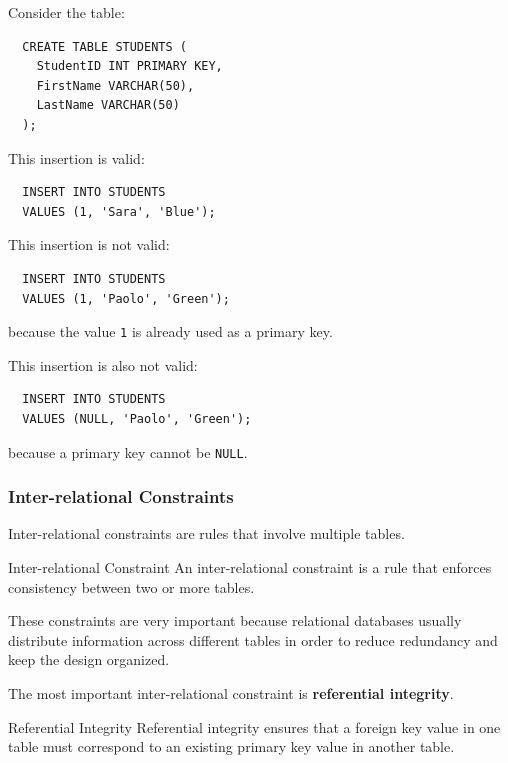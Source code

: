 \vs
 \begin{example}
  Consider the table:
  \begin{verbatim}
  CREATE TABLE STUDENTS (
    StudentID INT PRIMARY KEY,
    FirstName VARCHAR(50),
    LastName VARCHAR(50)
  );
  \end{verbatim}

  This insertion is valid:
  \begin{verbatim}
  INSERT INTO STUDENTS
  VALUES (1, 'Sara', 'Blue');
  \end{verbatim}

  \vspace{-0.4cm}
  This insertion is not valid:
  \begin{verbatim}
  INSERT INTO STUDENTS
  VALUES (1, 'Paolo', 'Green');
  \end{verbatim}

    \vspace{-0.4cm}
  because the value \texttt{1} is already used as a primary key.

  This insertion is also not valid:
  \begin{verbatim}
  INSERT INTO STUDENTS
  VALUES (NULL, 'Paolo', 'Green');
  \end{verbatim}

    \vspace{-0.4cm}
  because a primary key cannot be \texttt{NULL}.
 \end{example}

 \subsubsection{Inter-relational Constraints}

 Inter-relational constraints are rules that involve multiple tables.

 \begin{defbox}{Inter-relational Constraint}
  An inter-relational constraint is a rule that enforces consistency between two or more tables.
 \end{defbox}

 These constraints are very important because relational databases usually distribute information across different tables in order to reduce redundancy and keep the design organized.

 The most important inter-relational constraint is \textbf{referential integrity}.

 \begin{defbox}{Referential Integrity}
  Referential integrity ensures that a foreign key value in one table must correspond to an existing primary key value in another table.
 \end{defbox}

